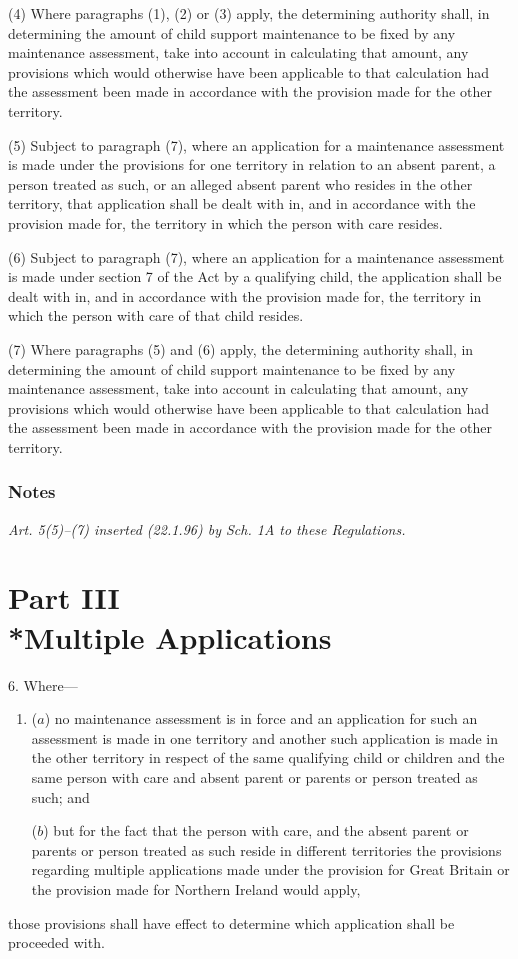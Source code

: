 \documentclass[a4paper]{article}
\newcommand{\parthead}{}
\newcommand\amendment[1]{\subsubsection*{Notes}{\itshape\frenchspacing\footnotesize #1 \par}}
\begin{document}
(4) Where paragraphs (1), (2) or (3) apply, the determining authority shall, in determining the amount of child support maintenance to be fixed by any maintenance assessment, take into account in calculating that amount, any provisions which would otherwise have been applicable to that calculation had the assessment been made in accordance with the provision made for the other territory.

(5) Subject to paragraph (7), where an application for a maintenance assessment is made under the provisions for one territory in relation to an absent parent, a person treated as such, or an alleged absent parent who resides in the other territory, that application shall be dealt with in, and in accordance with the provision made for, the territory in which the person with care resides.

(6) Subject to paragraph (7), where an application for a maintenance assessment is made under section 7 of the Act by a qualifying child, the application shall be dealt with in, and in accordance with the provision made for, the territory in which the person with care of that child resides.

(7) Where paragraphs (5) and (6) apply, the determining authority shall, in determining the amount of child support maintenance to be fixed by any maintenance assessment, take into account in calculating that amount, any provisions which would otherwise have been applicable to that calculation had the assessment been made in accordance with the provision made for the other territory.

\amendment{
Art. 5(5)--(7) inserted (22.1.96) by Sch. 1A to these Regulations.
}

\section[Part III --- Multiple Applications]{Part III\\*Multiple Applications}

\renewcommand\parthead{--- Schedule 1 Part III}

6.  Where—
\begin{enumerate}\item[]
($a$) no maintenance assessment is in force and an application for such an assessment is made in one territory and another such application is made in the other territory in respect of the same qualifying child or children and the same person with care and absent parent or parents or person treated as such; and

($b$) but for the fact that the person with care, and the absent parent or parents or person treated as such reside in different territories the provisions regarding multiple applications made under the provision for Great Britain or the provision made for Northern Ireland would apply,
\end{enumerate}
those provisions shall have effect to determine which application shall be proceeded with.
\end{document}
